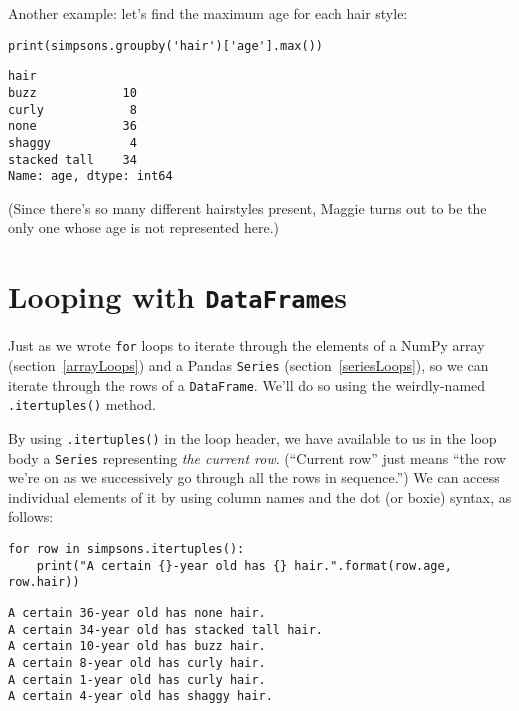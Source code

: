 Another example: let's find the maximum age for each hair style:

\begin{Verbatim}[fontsize=\small,samepage=true,frame=single,framesep=3mm]
print(simpsons.groupby('hair')['age'].max())
\end{Verbatim}
\vspace{-.2in}

\begin{Verbatim}[fontsize=\small,samepage=true,frame=leftline,framesep=5mm,framerule=1mm]
hair
buzz            10
curly            8
none            36
shaggy           4
stacked tall    34
Name: age, dtype: int64
\end{Verbatim}

(Since there's so many different hairstyles present, Maggie turns out to be the
only one whose age is not represented here.)


\section{Looping with \texttt{DataFrame}s}


Just as we wrote \texttt{for} loops to iterate through the elements of a NumPy
array (section~\ref{arrayLoops}) and a Pandas \texttt{Series}
(section~\ref{seriesLoops}), so we can iterate through the rows of a
\texttt{DataFrame}. We'll do so using the weirdly-named \texttt{.itertuples()}
method.

By using \texttt{.itertuples()} in the loop header, we have available to us in
the loop body a \texttt{Series} representing \textit{the current row}.
(``Current row'' just means ``the row we're on as we successively go through
all the rows in sequence.'') We can access individual elements of it by using
column names and the dot (or boxie) syntax, as follows:

\begin{Verbatim}[fontsize=\small,samepage=true,frame=single,framesep=3mm]
for row in simpsons.itertuples():
    print("A certain {}-year old has {} hair.".format(row.age, row.hair))
\end{Verbatim}
\vspace{-.2in}

\begin{Verbatim}[fontsize=\small,samepage=true,frame=leftline,framesep=5mm,framerule=1mm]
A certain 36-year old has none hair.
A certain 34-year old has stacked tall hair.
A certain 10-year old has buzz hair.
A certain 8-year old has curly hair.
A certain 1-year old has curly hair.
A certain 4-year old has shaggy hair.
\end{Verbatim}

